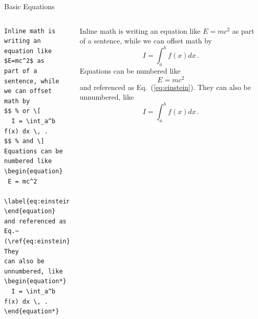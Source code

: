 \documentclass[aspectratio=1610]{beamer}
\begin{document}
\begin{frame}[fragile]{Basic Equations}
  \begin{columns}[T]
      \begin{lstlisting}
Inline math is writing an
equation like $E=mc^2$ as
part of a sentence, while
we can offset math by
$$ % or \[
  I = \int_a^b f(x) dx \, .
$$ % and \]
Equations can be numbered like
\begin{equation}
 E = mc^2
 \label{eq:einstein}
\end{equation}
and referenced as
Eq.~(\ref{eq:einstein}). They
can also be unnumbered, like
\begin{equation*}
  I = \int_a^b f(x) dx \, .
\end{equation*}
      \end{lstlisting}
Inline math is writing an
equation like $E=mc^2$ as
part of a sentence, while
we can offset math by
$$ %
  I = \int_a^b f(x) dx \, .
$$ %
Equations can be numbered like
\begin{equation}
 E = mc^2
 \label{eq:einstein}
\end{equation}
and referenced as
Eq.~(\ref{eq:einstein}). They
can also be unnumbered, like
\begin{equation*}
  I = \int_a^b f(x) dx \, .
\end{equation*}
  \end{columns}
\end{frame}
\end{document}
